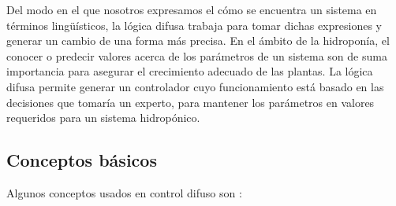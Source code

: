 Del modo en el que nosotros expresamos el cómo se encuentra un sistema en términos lingüísticos, la lógica difusa trabaja para tomar dichas expresiones y generar un cambio de una forma más precisa. En el ámbito de la hidroponía, el conocer o predecir valores acerca de los parámetros de un sistema son de suma importancia para asegurar el crecimiento adecuado de las plantas. La lógica difusa permite generar un controlador cuyo funcionamiento está basado en las decisiones que tomaría un experto, para mantener los parámetros en valores requeridos para un sistema hidropónico.

\subsection{Conceptos básicos}
Algunos conceptos usados en control difuso son \cite{passino1998fuzzy}:
